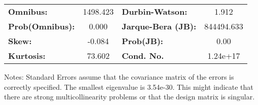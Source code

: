 \begin{center}
\begin{tabular}{lcccccc}
\bottomrule
\end{tabular}
\begin{tabular}{lclc}
\textbf{Omnibus:}       & 1498.423 & \textbf{  Durbin-Watson:     } &     1.912   \\
\textbf{Prob(Omnibus):} &   0.000  & \textbf{  Jarque-Bera (JB):  } & 844494.633  \\
\textbf{Skew:}          &  -0.084  & \textbf{  Prob(JB):          } &      0.00   \\
\textbf{Kurtosis:}      &  73.602  & \textbf{  Cond. No.          } &  1.24e+17   \\
\bottomrule
\end{tabular}
\end{center}

Notes: \newline
 [1] Standard Errors assume that the covariance matrix of the errors is correctly specified. \newline
 [2] The smallest eigenvalue is 3.54e-30. This might indicate that there are \newline
 strong multicollinearity problems or that the design matrix is singular.